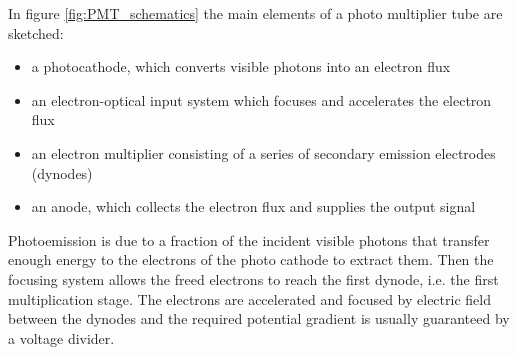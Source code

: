 In figure \ref{fig:PMT_schematics} the main elements of a photo multiplier tube are sketched:
\begin{itemize}
\item a photocathode, which converts visible photons into an electron flux
\item an electron-optical input system which focuses and accelerates the electron flux
\item an electron multiplier consisting of a series of secondary emission electrodes (dynodes)
\item an anode, which collects the electron flux and supplies the output signal
\end{itemize}
Photoemission is due to a fraction of the incident visible photons that transfer enough energy to the electrons of the photo cathode to extract them.
Then the focusing system allows the freed electrons to reach the first dynode, i.e. the first multiplication stage. The electrons are accelerated and focused by electric field between the dynodes and the required potential gradient is usually guaranteed by a voltage divider.


